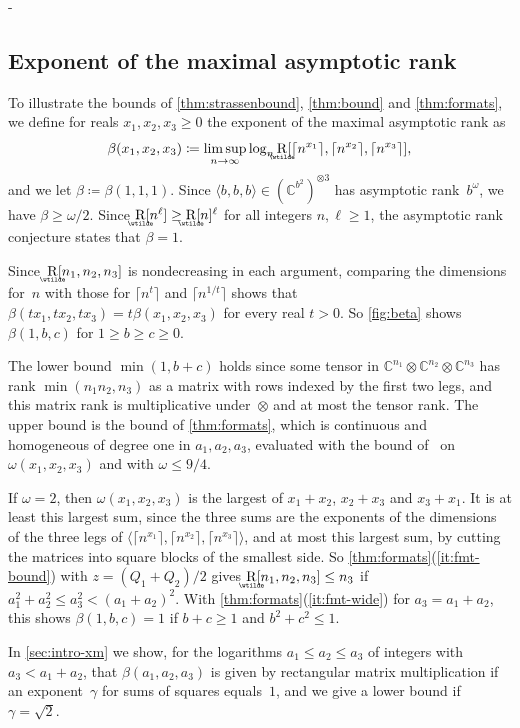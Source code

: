 \documentclass[11pt,letterpaper]{article}
\makeatletter
\numberwithin{equation}{section}
\newcommand{\reservelines}[1]{\par\penalty\z@\dimen@\pagegoal\advance\dimen@-\pagetotal
 \ifdim\dimen@<#1\baselineskip\ifdim\dimen@>\z@\vfil\fi\break\fi}
\let\plainsubsection\subsection
\renewcommand{\subsection}{\reservelines{7}\plainsubsection}
\theoremstyle{definition}
\DeclareMathOperator{\asymprank}{\underaccent{\wtilde}{R}}
\newcommand{\CC}{\mathbb{C}}
\makeatother
\begin{document}
\subsection{Exponent of the maximal asymptotic rank}\label{sec:intro-beta}

To illustrate the bounds of \cref{thm:strassenbound}, \cref{thm:bound} and \cref{thm:formats}, we define for reals
$x_1,x_2,x_3\ge0$ the exponent of the maximal asymptotic rank as
\[
 \beta(x_1,x_2,x_3)\coloneqq\limsup_{n\to\infty}\log_n\asymprank[\lceil n^{x_1}\rceil,\lceil n^{x_2}\rceil,\lceil
 n^{x_3}\rceil],
\]
and we let $\beta\coloneqq\beta(1,1,1)$. Since $\langle b,b,b\rangle\in(\CC^{b^2})^{\otimes3}$ has asymptotic
rank~$b^\omega$, we have $\beta\ge\omega/2$. Since $\asymprank[n^\ell]\ge\asymprank[n]^\ell$ for all integers $n,\ell\ge1$, the asymptotic rank conjecture states that $\beta=1$.

Since~$\asymprank[n_1,n_2,n_3]$ is nondecreasing in each argument, comparing the
dimensions for~$n$ with those for $\lceil n^t\rceil$ and $\lceil n^{1/t}\rceil$ shows that
$\beta(tx_1,tx_2,tx_3)=t\beta(x_1,x_2,x_3)$ for every real $t>0$. So \cref{fig:beta} shows $\beta(1,b,c)$ for $1\ge
b\ge c\ge0$.

The lower bound $\min(1,b+c)$ holds since some tensor in $\CC^{n_1}\otimes\CC^{n_2}\otimes\CC^{n_3}$ has rank
$\min(n_1n_2,n_3)$ as a matrix with rows indexed by the first two legs, and this matrix rank is multiplicative
under~$\otimes$ and at most the tensor rank. The upper bound is the bound of \cref{thm:formats}, which is
continuous and homogeneous of degree one in $a_1,a_2,a_3$, evaluated with the bound
of~\cite[Theorem~1.2]{amanov2026multiplyingmatricespolynomialsexposition} on $\omega(x_1,x_2,x_3)$ and with
$\omega\le9/4$.

If $\omega=2$, then $\omega(x_1,x_2,x_3)$ is the largest of $x_1+x_2$, $x_2+x_3$ and $x_3+x_1$. It is at least
this largest sum, since the three sums are the exponents of the dimensions of the three legs of $\langle\lceil n^{x_1}\rceil,\lceil
n^{x_2}\rceil,\lceil n^{x_3}\rceil\rangle$, and at most this largest sum, by cutting the matrices into square blocks of the
smallest side. So \cref{thm:formats}(\ref{it:fmt-bound}) with $z=(Q_1+Q_2)/2$ gives
$\asymprank[n_1,n_2,n_3]\le n_3$ if $a_1^2+a_2^2\le a_3^2<(a_1+a_2)^2$. With \cref{thm:formats}(\ref{it:fmt-wide}) for
$a_3=a_1+a_2$, this shows $\beta(1,b,c)=1$ if $b+c\ge1$ and $b^2+c^2\le1$.

In \cref{sec:intro-xm} we show, for the logarithms $a_1\le a_2\le a_3$ of integers with $a_3<a_1+a_2$, that
$\beta(a_1,a_2,a_3)$ is given by rectangular matrix multiplication if an exponent~$\gamma$ for sums of squares
equals~$1$, and we give a lower bound if $\gamma=\sqrt2$.
\end{document}
